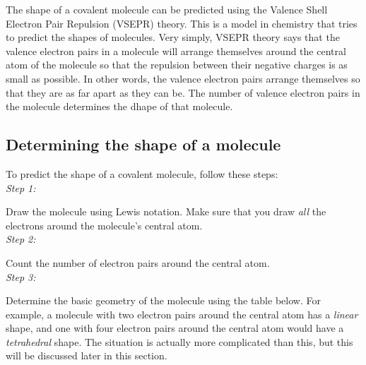The shape of a covalent molecule can be predicted using the Valence Shell Electron Pair Repulsion (VSEPR) theory. This is a model in chemistry that tries to predict the shapes of molecules. Very simply, VSEPR theory says that the valence electron pairs in a molecule will arrange themselves around the central atom of the molecule so that the repulsion between their negative charges is as small as possible. In other words, the valence electron pairs arrange themselves so that they are as far apart as they can be. The number of valence electron pairs in the molecule determines the dhape of that molecule.\\


\subsection{Determining the shape of a molecule}

To predict the shape of a covalent molecule, follow these steps:\\

\textit{Step 1:}

Draw the molecule using Lewis notation. Make sure that you draw \textit{all} the electrons around the molecule's central atom.\\

\textit{Step 2:}

Count the number of electron pairs around the central atom.\\

\textit{Step 3:}

Determine the basic geometry of the molecule using the table below. For example, a molecule with two electron pairs around the central atom has a \textit{linear} shape, and one with four electron pairs around the central atom would have a \textit{tetrahedral} shape. The situation is actually more complicated than this, but this will be discussed later in this section.\\

